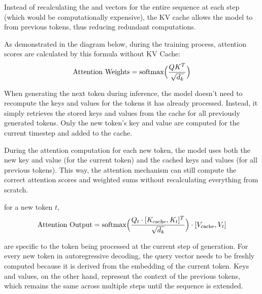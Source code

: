 \documentclass[letterpaper,11pt,english]{sphinxmanual}
\begin{document}
\sphinxAtStartPar
Instead of recalculating the  and  vectors for
the entire sequence at each step (which would be computationally
expensive), the KV cache allows the model to  from previous tokens, thus reducing redundant computations.

\sphinxAtStartPar
As demonstrated in the diagram below, during the training process,
attention scores are calculated by this formula without KV Cache:
\begin{equation*}
\begin{split}\text{Attention Weights} = \text{softmax}\Big({QK^T\over{\sqrt{d_k}}}\Big)\end{split}
\end{equation*}
\sphinxAtStartPar
{}

\sphinxAtStartPar
When generating the next token during inference, the model doesn’t need
to recompute the keys and values for the tokens it has already
processed. Instead, it simply retrieves the stored keys and values from
the cache for all previously generated tokens. Only the new token’s key
and value are computed for the current timestep and added to the cache.

\sphinxAtStartPar
During the attention computation for each new token, the model uses both
the new key and value (for the current token) and the cached keys and
values (for all previous tokens). This way, the attention mechanism can
still compute the correct attention scores and weighted sums without
recalculating everything from scratch.

\sphinxAtStartPar
{} for a new token \(t\),
\begin{equation*}
\begin{split}\text{Attention Output} = \text{softmax} \Big({Q_t \cdot [K_{\text{cache}}, K_t]^T\over \sqrt{d_k}}\Big) \cdot [V_{\text{cache}}, V_t]\end{split}
\end{equation*}
\sphinxAtStartPar
{}

\sphinxAtStartPar
{}  are specific to the token being
processed at the current step of generation. For every new token in
autoregressive decoding, the query vector needs to be freshly computed
because it is derived from the embedding of the current token. Keys and
values, on the other hand, represent the context of the previous tokens,
which remains the same across multiple steps until the sequence is
extended.
\end{document}
